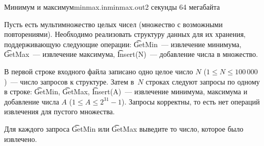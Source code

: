 \begin{problem}
{Минимум и максимум}{minmax.in}{minmax.out}{2 секунды}
{64 мегабайта}

Пусть есть мультимножество целых чисел (множество с возможными повторениями).
Необходимо реализовать структуру данных для их хранения, поддерживающую следующие операции:
\t{GetMin}~--- извлечение минимума,
\t{GetMax}~--- извлечение максимума,
\t{Insert(N)}~--- добавление числа в множество.

\InputFile

В первой строке входного файла записано одно целое число $N$
($1 \le N \le 100\,000$)~--- число запросов к структуре.
Затем в~$N$ строках следуют запросы по одному в строке:
\t{GetMin}, \t{GetMax}, \t{Insert(A)}~---
извлечение минимума, максимума и добавление числа $A$
($1 \le A \le 2^{31}-1$).
Запросы корректны, то есть нет операций извлечения для пустого множества. 

\OutputFile

Для каждого запроса \t{GetMin} или \t{GetMax} выведите то число, которое было извлечено.

\Examples

\begin{example}
%
\end{example}

\end{problem}
